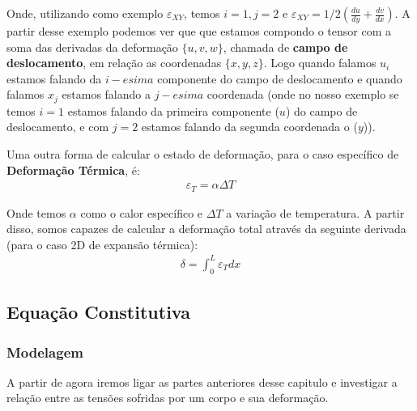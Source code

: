 \documentclass{article}
\begin{document}
Onde, utilizando como exemplo $\varepsilon_{XY}$, temos $i=1, j=2$ e $\varepsilon_{XY} = 1/2\left(\frac{du}{dy} + \frac{dv}{dx}\right)$. A partir desse exemplo podemos ver que que estamos compondo o tensor com a soma das derivadas da deformação $\{u, v, w\}$, chamada de \textbf{campo de deslocamento}, em relação as coordenadas $\{x, y, z\}$. Logo quando falamos $u_i$ estamos falando da $i-esima$ componente do campo de deslocamento e quando falamos $x_j$ estamos falando a $j-esima$ coordenada (onde no nosso exemplo se temos $i=1$ estamos falando da primeira componente ($u$) do campo de deslocamento, e com $j=2$ estamos falando da segunda coordenada o ($y$)).

Uma outra forma de calcular o estado de deformação, para o caso específico de \textbf{Deformação Térmica}, é:
\begin{align*}
    \varepsilon_T = \alpha \Delta T
\end{align*}

Onde temos $\alpha$ como o calor específico e $\Delta T$ a variação de temperatura. A partir disso, somos capazes de calcular a deformação total através da seguinte derivada (para o caso 2D de expansão térmica):
\begin{align*}
    \delta = \int^L_0 \varepsilon_T dx
\end{align*}

\subsection{Equação Constitutiva}

\subsubsection{Modelagem}
A partir de agora iremos ligar as partes anteriores desse capitulo e investigar a relação entre as tensões sofridas por um corpo e sua deformação.
\end{document}

